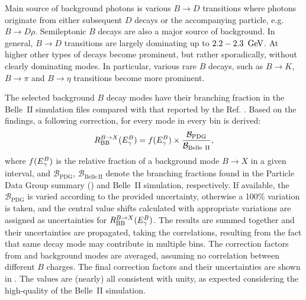 Main source of background photons is various $B\to D$ transitions where photons originate from either subsequent $D$ decays or the accompanying particle, e.g. $B\to D\rho$.
Semileptonic $B$ decays are also a major source of background.
In general, $B\to D$ transitions are largely dominating up to $2.2-2.3~\mathrm{\,Ge\kern -0.1em V}$.
At higher \EB other types of decays become prominent, but rather sporadically, without clearly dominating modes.
In particular, various rare $B$ decays, such as $B\to K$, $B\to\pi$ and $B\to\eta$ transitions become more prominent.

The selected background $B$ decay modes have their branching fraction in the Belle~II simulation files compared with that reported by the Ref. \cite{Workman:2022ynf}.
Based on the findings, a following correction, for every mode in every \EB bin is derived:
\begin{equation}\label{eq:background_bf_correction}
    R^{B\rightarrow X}_{\mathrm{BB}}({E^B_{\gamma}}) =  f({E^B_{\gamma}}) \times \frac{\mathcal{B}_{\mathrm{PDG}}}{\mathcal{B}_{\mathrm{Belle~II}}},
\end{equation}
where $f({E^B_{\gamma}})$ is the relative fraction of a background mode $B\to X$ in a given \EB interval,
and $\mathcal{B}_{\mathrm{PDG}}$, $\mathcal{B}_{\mathrm{Belle~II}}$ denote the branching fractions found in the Particle Data Group summary (\cite{Workman:2022ynf}) and Belle~II simulation, respectively.
If available, the $\mathcal{B}_{\mathrm{PDG}}$ is varied according to the provided uncertainty, otherwise a 100\% variation is taken, and the central value shifts calculated with appropriate variations are assigned as uncertainties for $R^{B\rightarrow X}_{\mathrm{BB}}({E^B_{\gamma}})$.
The results are summed together and their uncertainties are propagated, taking the correlations, resulting from the fact that same decay mode may contribute in multiple \EB bins.
The correction factors from \Bp and \Bz background modes are averaged, assuming no correlation between different $B$ charges.
The final correction factors and their uncertainties are shown in .
The values are (nearly) all consistent with unity, as expected considering the high-quality of the Belle~II simulation.

